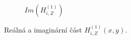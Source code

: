 \begin{figure}[ht]
\begin{subfigure}[b]{0.45\textwidth}
\begin{tikzpicture}
        \end{tikzpicture}
        \caption{$Im(H_{i,Z}^{(1)})$}
    \end{subfigure}
    \caption{Reálná a imaginární část $H_{i,Z}^{(1)}(x, y)$.}
    \label{fig:DipoleHZ}
\end{figure}